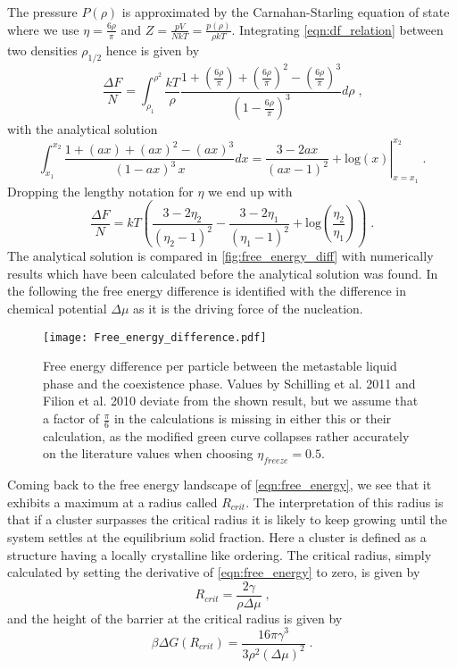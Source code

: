 The pressure $P(\rho)$ is approximated by the Carnahan-Starling equation of state where we use $\eta = \frac{6 \rho }{\pi}$ and $Z=\frac{pV}{NkT} = \frac{p(\rho)}{\rho kT}$. Integrating \autoref{eqn:df_relation} between two densities $\rho_{1/2}$ hence is given by
\begin{equation}
\frac{\Delta F}{N} = \int_{\rho_1}^{\rho^2} \frac{kT}{\rho} \frac{1+\left( \frac{6 \rho}{\pi}\right) +\left( \frac{6 \rho}{\pi}\right)^2 - \left( \frac{6 \rho}{\pi}\right)^3}{\left( 1 - \frac{6 \rho}{\pi}\right)^3} d\rho \; \text{,}
\end{equation}
with the analytical solution
\begin{equation}
\int_{x_1}^{x_2} \frac{1+(ax) +(ax)^2 - (ax)^3 }{( 1 - ax )^3 \,  x} dx = \left. \frac{3-2ax}{(ax-1)^2} + \text{log}(x) \right|_{x=x_1}^{x_2} \; \text{.}
\end{equation}
Dropping the lengthy notation for $\eta$ we end up with
\begin{equation}
\frac{\Delta F}{N} = kT \left(  \frac{3-2 \eta_2}{(\eta_2 - 1)^2} - \frac{3-2 \eta_1}{(\eta_1 - 1)^2} + \text{log}\left( \frac{\eta_2}{\eta_1} \right) \right) \; \text{.}
\end{equation}
The analytical solution is compared in \autoref{fig:free_energy_diff} with numerically results which have been calculated before the analytical solution was found. In the following the free energy difference is identified with the difference in chemical potential $\Delta \mu$ as it is the driving force of the nucleation.\\
\begin{figure}[h]
\centering
\texttt{[image: Free\_energy\_difference.pdf]}
\caption[Free energy difference between fluid and solid phase]{Free energy difference per particle between the metastable liquid phase and the coexistence phase. Values by Schilling et al. 2011\cite{Schilling2011} and Filion et al. 2010\cite{Filion2010a} deviate from the shown result, but we assume that a factor of $\frac{\pi}{6}$ in the calculations is missing in either this or their calculation, as the modified green curve collapses rather accurately on the literature values when choosing $\eta_{freeze}=0.5$.}
\label{fig:free_energy_diff}
\end{figure}


Coming back to the free energy landscape of \autoref{eqn:free_energy}, we see that it exhibits a maximum at a radius called $R_{crit}$. The interpretation of this radius is that if a cluster surpasses the critical radius it is likely to keep growing until the system settles at the equilibrium solid fraction. Here a cluster is defined as a structure having a locally crystalline like ordering. The critical radius, simply calculated by setting the derivative of \autoref{eqn:free_energy} to zero, is given by
\begin{equation}
\label{eqn:r_crit}
R_{crit} = \frac{2 \gamma}{\rho \Delta \mu } \; \text{,}
\end{equation}
and the height of the barrier at the critical radius is given by
\begin{equation}
\beta \Delta G (R_{crit}) = \frac{16 \pi \gamma^3}{3 \rho^2 (\Delta \mu )^2} \; \text{.}
\end{equation}

